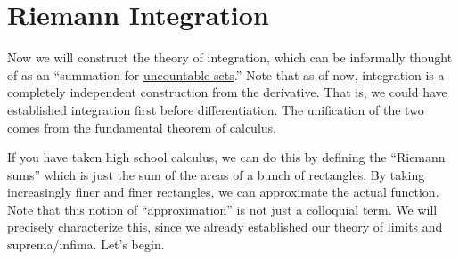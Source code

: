 \section{Riemann Integration}
  
  Now we will construct the theory of integration, which can be informally thought of as an ``summation for \hyperref[st-def:uncountable-set]{uncountable sets}.'' Note that as of now, integration is a completely independent construction from the derivative. That is, we could have established integration first before differentiation. The unification of the two comes from the fundamental theorem of calculus. 

  If you have taken high school calculus, we can do this by defining the ``Riemann sums'' which is just the sum of the areas of a bunch of rectangles. By taking increasingly finer and finer rectangles, we can approximate the actual function. Note that this notion of ``approximation'' is not just a colloquial term. We will precisely characterize this, since we already established our theory of limits and suprema/infima. Let's begin. 

